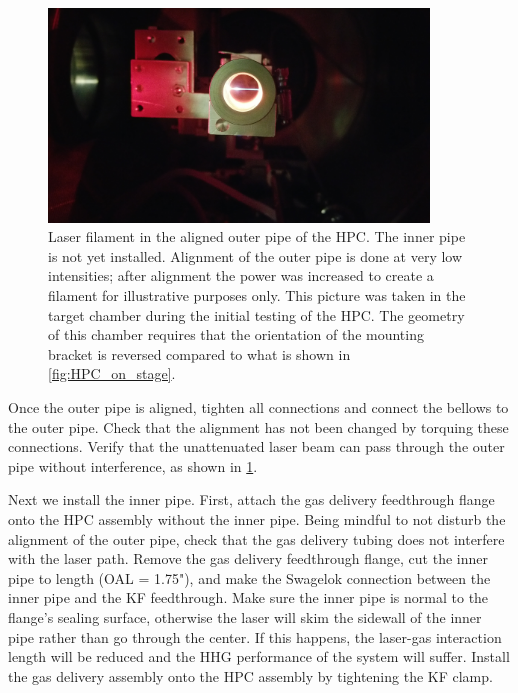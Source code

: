 \begin{figure}
	\centering
	\includegraphics[width=0.9\textwidth]{figures/app1/HPC_outer_can_laser.jpg}
	\caption{Laser filament in the aligned outer pipe of the HPC. The inner pipe is not yet installed. Alignment of the outer pipe is done at very low intensities; after alignment the power was increased to create a filament for illustrative purposes only. This picture was taken in the target chamber during the initial testing of the HPC. The geometry of this chamber requires that the orientation of the mounting bracket is reversed compared to what is shown in \cref{fig:HPC_on_stage}.}
	\label{fig:HPC_outer_can_laser}
\end{figure}

Once the outer pipe is aligned, tighten all connections and connect the bellows to the outer pipe. Check that the alignment has not been changed by torquing these connections. Verify that the unattenuated laser beam can pass through the outer pipe without interference, as shown in \cref{fig:HPC_outer_can_laser}. 

Next we install the inner pipe. First, attach the gas delivery feedthrough flange onto the HPC assembly without the inner pipe. Being mindful to not disturb the alignment of the outer pipe, check that the gas delivery tubing does not interfere with the laser path. Remove the gas delivery feedthrough flange, cut the inner pipe to length (OAL = 1.75"), and make the Swagelok connection between the inner pipe and the KF feedthrough. Make sure the inner pipe is normal to the flange's sealing surface, otherwise the laser will skim the sidewall of the inner pipe rather than go through the center. If this happens, the laser-gas interaction length will be reduced and the HHG performance of the system will suffer. Install the gas delivery assembly onto the HPC assembly by tightening the KF clamp.

